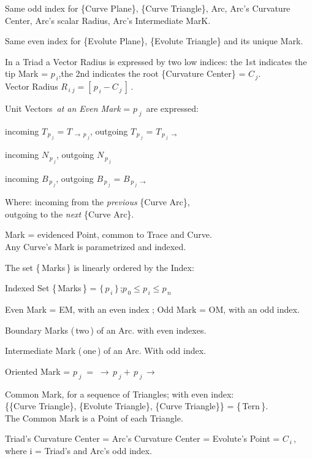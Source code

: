 \documentclass[12pt]{article} %
\begin{document}
\noindent Same odd index for \{Curve Plane\}, \{Curve Triangle\}, Arc,  Arc's Curvature Center, Arc's scalar Radius, Arc's Intermediate MarK.

\noindent Same even index for \{Evolute Plane\}, \{Evolute Triangle\}
and its unique Mark.
 
\noindent In a Triad a Vector Radius is expressed by two low indices: the 1st indicates the tip Mark = $p_{\,i}$\;,\;the 2nd indicates the root \{Curvature Center\} = $C_{\,j}$. \\Vector Radius \;$R_{\,i\;j} = [\,p_{\,i} - C_{\,j}\,]$\,.

\noindent Unit Vectors\, \textsl{at an Even Mark} = $p_{\;j}$ \,are  expressed:

 incoming $T_{\,p_{\;j}}$ = $T_{\,\to\,p_{\;j}}$\quad , \quad outgoing $T_{\,p_{\;j}}$ = $T_{\,p_{\;j}\,\to}$
 
 incoming $N_{\,p_{\;j}}$\quad        , \quad outgoing $N_{\,p_{\;j}}$
 
 incoming $B_{\,p_{\;j}}$\quad, \quad outgoing $B_{\,p_{\;j}}$ = $B_{\,p_{\;j}\,\to}$
  
Where: incoming from the\; \textsl{previous} \{Curve Arc\},\\ outgoing to the\; \textsl{next} \{Curve Arc\}.

\noindent Mark = evidenced Point, common to Trace and Curve.\\ Any Curve's Mark is parametrized and indexed.

\noindent The set \{\,Marks\,\} is linearly ordered by the Index:  

\noindent Indexed Set \{\,Marks\,\} = $\{\,p_{\,i}\,\}$\,;\quad $p_{\,0} \leq p_{\,i} \leq p_{\,n}$

\noindent Even Mark = EM, with an even index ; Odd Mark = OM, with an odd index.

\noindent Boundary Marks (\,two\,) of an Arc. with even indexes.

\noindent Intermediate Mark (\,one\,) of an Arc. With odd index.

\noindent Oriented Mark =  $p_{\;j}\;=\;\to\,p_{\;j} +\, p_{\;j}\,\to$

\noindent Common Mark, for a sequence of Triangles; with even index:\\ \big\{\;\{Curve Triangle\}, \{Evolute Triangle\}, \{Curve Triangle\}\;\big\} = \{\,Tern\,\}.\\The Common Mark is a Point of each Triangle. 

\noindent Triad's Curvature Center = Arc's Curvature Center
 = Evolute's Point = $C_{\,i}$\,,\\ where i = Triad's and Arc's odd index.
\end{document}
